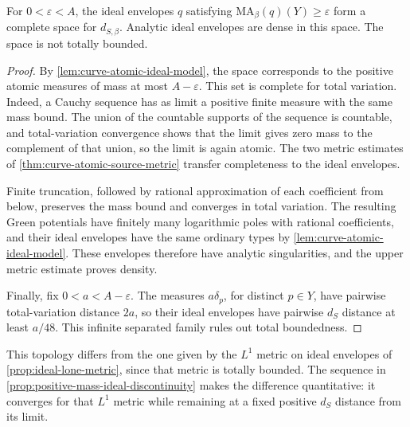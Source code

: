 \begin{corollary}\label{cor:curve-ideal-source-completeness}
For $0<\varepsilon<A$, the ideal envelopes $q$ satisfying $\mathrm{MA}_\beta(q)(Y)\geq\varepsilon$ form a complete space for $d_{S,\beta}$. Analytic ideal envelopes are dense in this space. The space is not totally bounded.
\end{corollary}
\begin{proof}
By \cref{lem:curve-atomic-ideal-model}, the space corresponds to the positive atomic measures of mass at most $A-\varepsilon$. This set is complete for total variation. Indeed, a Cauchy sequence has as limit a positive finite measure with the same mass bound. The union of the countable supports of the sequence is countable, and total-variation convergence shows that the limit gives zero mass to the complement of that union, so the limit is again atomic. The two metric estimates of \cref{thm:curve-atomic-source-metric} transfer completeness to the ideal envelopes.

Finite truncation, followed by rational approximation of each coefficient from below, preserves the mass bound and converges in total variation. The resulting Green potentials have finitely many logarithmic poles with rational coefficients, and their ideal envelopes have the same ordinary types by \cref{lem:curve-atomic-ideal-model}. These envelopes therefore have analytic singularities, and the upper metric estimate proves density.

Finally, fix $0<a<A-\varepsilon$. The measures $a\delta_p$, for distinct $p\in Y$, have pairwise total-variation distance $2a$, so their ideal envelopes have pairwise $d_S$ distance at least $a/48$. This infinite separated family rules out total boundedness.
\end{proof}

This topology differs from the one given by the $L^1$ metric on ideal envelopes of \cref{prop:ideal-lone-metric}, since that metric is totally bounded. The sequence in \cref{prop:positive-mass-ideal-discontinuity} makes the difference quantitative: it converges for that $L^1$ metric while remaining at a fixed positive $d_S$ distance from its limit.
